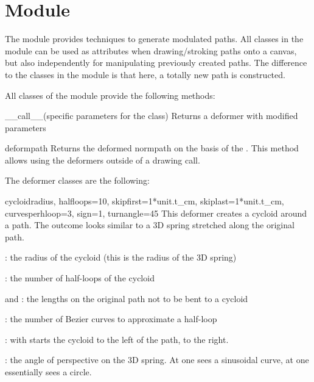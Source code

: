 \section{Module }
\label{deformer}


The  module provides techniques to generate modulated paths.
All classes in the  module can be used as attributes when
drawing/stroking paths onto a canvas, but also independently for manipulating
previously created paths. The difference to the classes in the 
module is that here, a totally new path is constructed.

All classes of the  module provide the following methods:

\begin{methoddesc}{__call__}{(specific parameters for the class)}
Returns a deformer with modified parameters
\end{methoddesc}

\begin{methoddesc}{deform}{path} Returns the deformed normpath on the basis of
the . This method allows using the deformers outside of a
drawing call.
\end{methoddesc}

The deformer classes are the following:

\begin{classdesc}{cycloid}{radius, halfloops=10, skipfirst=1*unit.t_cm,
skiplast=1*unit.t_cm, curvesperhloop=3, sign=1, turnangle=45}
This deformer creates a cycloid around a path. The outcome looks similar to
a 3D spring stretched along the original path.

: the radius of the cycloid (this is the radius of the 3D spring)

: the number of half-loops of the cycloid

 and : the lengths on the original path not to be bent to a cycloid

: the number of Bezier curves to approximate a half-loop

: with  starts the cycloid to the left of the path,  to the right.

: the angle of perspective on the 3D spring. At
 one sees a sinusoidal curve, at  one
essentially sees a circle.
\end{classdesc}

